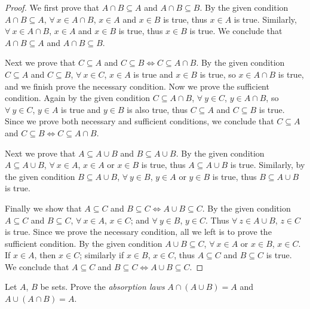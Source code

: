 \begin{proof}
We first prove that \(A \cap B \subseteq A\) and \(A \cap B \subseteq B\).
By the given condition \(A \cap B \subseteq A\), \(\forall\ x \in A \cap B\), \(x \in A\) and \(x \in B\) is true, thus \(x \in A\) is true.
Similarly, \(\forall\ x \in A \cap B\), \(x \in A\) and \(x \in B\) is true, thus \(x \in B\) is  true.
We conclude that \(A \cap B \subseteq A\) and \(A \cap B \subseteq B\).

Next we prove that \(C \subseteq A\) and \(C \subseteq B \iff C \subseteq A \cap B\).
By the given condition \(C \subseteq A\) and \(C \subseteq B\), \(\forall\ x \in C\), \(x \in A\) is true and \(x \in B\) is true, so \(x \in A \cap B\) is true, and we finish prove the necessary condition.
Now we prove the sufficient condition.
Again by the given condition \(C \subseteq A \cap B\), \(\forall\ y \in C\), \(y \in A \cap B\), so \(\forall\ y \in C\), \(y \in A\) is true and \(y \in B\) is also true, thus \(C \subseteq A\) and \(C \subseteq B\) is true.
Since we prove both necessary and sufficient conditions, we conclude that \(C \subseteq A\) and \(C \subseteq B \iff C \subseteq A \cap B\).

Next we prove that \(A \subseteq A \cup B\) and \(B \subseteq A \cup B\).
By the given condition \(A \subseteq A \cup B\), \(\forall\ x \in A\), \(x \in A\) or \(x \in B\) is true, thus \(A \subseteq A \cup B\) is true.
Similarly, by the given condition \(B \subseteq A \cup B\), \(\forall\ y \in B\), \(y \in A\) or \(y \in B\) is true, thus \(B \subseteq A \cup B\) is true.

Finally we show that \(A \subseteq C\) and \(B \subseteq C \iff A \cup B \subseteq C\).
By the given condition \(A \subseteq C\) and \(B \subseteq C\), \(\forall\ x \in A\), \(x \in C\); and \(\forall\ y \in B\), \(y \in C\).
Thus \(\forall\ z \in A \cup B\), \(z \in C\) is true.
Since we prove the necessary condition, all we left is to prove the sufficient condition.
By the given condition \(A \cup B \subseteq C\), \(\forall\ x \in A\) or \(x \in B\), \(x \in C\).
If \(x \in A\), then \(x \in C\); similarly if \(x \in B\), \(x \in C\), thus \(A \subseteq C\) and \(B \subseteq C\) is true.
We conclude that \(A \subseteq C\) and \(B \subseteq C \iff A \cup B \subseteq C\).
\end{proof}

\begin{exercise}\label{ex 3.1.8}
Let \(A\), \(B\) be sets.
Prove the \emph{absorption laws} \(A \cap (A \cup B) = A\) and \(A \cup (A \cap B) = A\).
\end{exercise}

